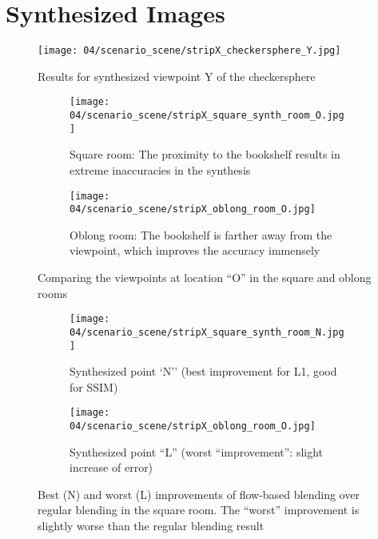 \chapter{Synthesized Images}\label{imgs}

\begin{figure}
		\centering
    \texttt{[image: 04/scenario\_scene/stripX\_checkersphere\_Y.jpg]}
		\caption{Results for synthesized viewpoint Y of the checkersphere}
		\label{fig:scene_checkersphere_Y}
\end{figure}

\begin{figure}
\centering
    \hfill
    \begin{subfigure}[b]{\textwidth}
            \centering
            \texttt{[image: 04/scenario\_scene/stripX\_square\_synth\_room\_O.jpg]}
            \caption{Square room: The proximity to the bookshelf results in extreme inaccuracies in the synthesis}
    \end{subfigure}
    \hfill

    \hfill
    \begin{subfigure}[b]{\textwidth}
            \centering
            \texttt{[image: 04/scenario\_scene/stripX\_oblong\_room\_O.jpg]}
            \caption{Oblong room: The bookshelf is farther away from the viewpoint, which improves the accuracy immensely}
    \end{subfigure}
    \hfill
  \caption{Comparing the viewpoints at location ``O'' in the square and oblong rooms} \label{fig:scene_square_oblong_O}
\end{figure}

\begin{figure}
\centering
    \hfill
    \begin{subfigure}[b]{\textwidth}
            \centering
            \texttt{[image: 04/scenario\_scene/stripX\_square\_synth\_room\_N.jpg]}
            \caption{Synthesized point `N'' (best improvement for L1, good for SSIM)}
    \end{subfigure}
    \hfill

    \hfill
    \begin{subfigure}[b]{\textwidth}
            \centering
            \texttt{[image: 04/scenario\_scene/stripX\_oblong\_room\_O.jpg]}
            \caption{Synthesized point ``L'' (worst ``improvement'': slight increase of error)}
    \end{subfigure}
    \hfill
  \caption[Best and worst improvements of flow-based blending over regular blending in the square room]{Best (N) and worst (L) improvements of flow-based blending over regular blending in the square room. The ``worst'' improvement is slightly worse than the regular blending result} \label{fig:scene_square_best_worst}
\end{figure}

